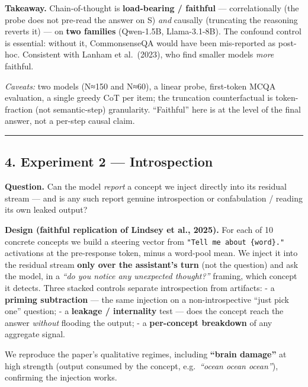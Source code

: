 \documentclass[
]{article}
\begin{document}
\textbf{Takeaway.} Chain-of-thought is \textbf{load-bearing / faithful}
--- correlationally (the probe does not pre-read the answer on S)
\emph{and} causally (truncating the reasoning reverts it) --- on
\textbf{two families} (Qwen-1.5B, Llama-3.1-8B). The confound control is
essential: without it, CommonsenseQA would have been mis-reported as
post-hoc. Consistent with Lanham et al.~(2023), who find smaller models
\emph{more} faithful.

\emph{Caveats:} two models (N≈150 and N≈60), a linear probe, first-token
MCQA evaluation, a single greedy CoT per item; the truncation
counterfactual is token-fraction (not semantic-step) granularity.
``Faithful'' here is at the level of the final answer, not a per-step
causal claim.

\begin{center}\rule{0.5\linewidth}{0.5pt}\end{center}

\subsection{4. Experiment 2 ---
Introspection}\label{experiment-2-introspection}

\textbf{Question.} Can the model \emph{report} a concept we inject
directly into its residual stream --- and is any such report genuine
introspection or confabulation / reading its own leaked output?

\textbf{Design (faithful replication of Lindsey et al., 2025).} For each
of 10 concrete concepts we build a steering vector from
\texttt{"Tell\ me\ about\ \{word\}."} activations at the pre-response
token, minus a word-pool mean. We inject it into the residual stream
\textbf{only over the assistant's turn} (not the question) and ask the
model, in a \emph{``do you notice any unexpected thought?''} framing,
which concept it detects. Three stacked controls separate introspection
from artifacts: - a \textbf{priming subtraction} --- the same injection
on a non-introspective ``just pick one'' question; - a \textbf{leakage /
internality} test --- does the concept reach the answer \emph{without}
flooding the output; - a \textbf{per-concept breakdown} of any aggregate
signal.

We reproduce the paper's qualitative regimes, including \textbf{``brain
damage''} at high strength (output consumed by the concept,
e.g.~\emph{``ocean ocean ocean''}), confirming the injection works.
\end{document}
